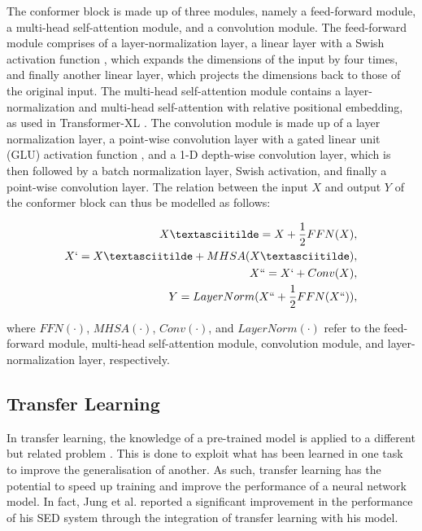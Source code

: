 The conformer block is made up of three modules, namely a feed-forward module, a multi-head self-attention module, and a convolution module. The feed-forward module comprises of a layer-normalization layer, a linear layer with a Swish activation function \cite{ramachandran2017searching}, which expands the dimensions of the input by four times, and finally another linear layer, which projects the dimensions back to those of the original input. The multi-head self-attention module contains a layer-normalization and multi-head self-attention with relative positional embedding, as used in Transformer-XL \cite{dai-etal-2019-transformer}. The convolution module is made up of a layer normalization layer, a point-wise convolution layer with a gated linear unit (GLU) activation function \cite{dauphin2017language}, and a 1-D depth-wise convolution layer, which is then followed by a batch normalization layer, Swish activation, and finally a point-wise convolution layer. The relation between the input \(X\) and output \(Y\) of the conformer block can thus be modelled as follows:

\begin{align}
X˜ = X + \frac{1}{2}FFN(X),\\
X` = X˜ + MHSA(X˜),\\
X`` = X` + Conv(X),\\
Y = LayerNorm(X`` + \frac{1}{2}FFN(X``)),  
\end{align}

where \(FFN(\cdot)\), \(MHSA(\cdot)\), \(Conv(\cdot)\), and \(LayerNorm(\cdot)\) refer to the feed-forward module, multi-head self-attention module, convolution module, and layer-normalization layer, respectively.

\subsection{Transfer Learning}

In transfer learning, the knowledge of a pre-trained model is applied to a different but related problem \cite{trans-learn}. This is done to exploit what has been learned in one task to improve the generalisation of another. As such, transfer learning has the potential to speed up training and improve the performance of a neural network model. In fact, Jung et al. \cite{Jung_2019} reported a significant improvement in the performance of his SED system through the integration of transfer learning with his model.\\ 

